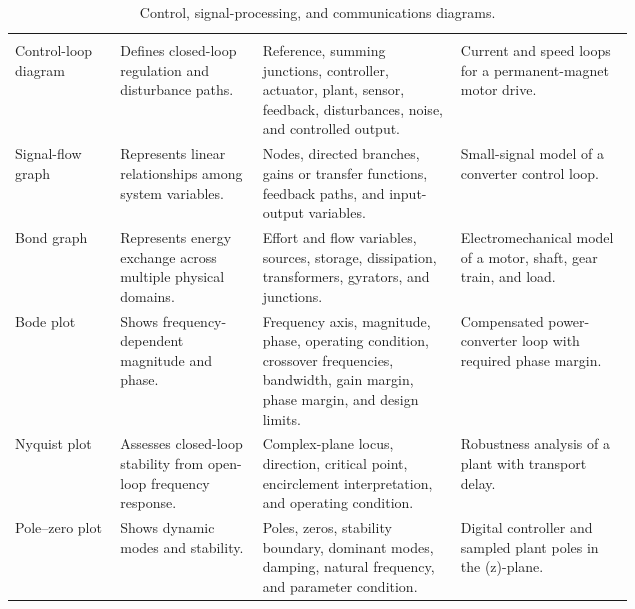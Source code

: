 \begin{singlespace}
\setlength{\LTcapwidth}{\linewidth}
\begin{longtable}{@{}L{0.17\linewidth} L{0.23\linewidth} L{0.32\linewidth} L{\tabcolsep\relax}@{}}
\caption{Control, signal-processing, and communications diagrams.}\label{tab:analysis-diagrams}\\
 &  &  &  \\
\midrule
\endfirsthead
{}
 &  &  &  \\
\midrule
\endhead
\bottomrule
\endfoot
Control-loop diagram & Defines closed-loop regulation and disturbance paths. & Reference, summing junctions, controller, actuator, plant, sensor, feedback, disturbances, noise, and controlled output. & Current and speed loops for a permanent-magnet motor drive. \\
\addlinespace[3pt]
Signal-flow graph & Represents linear relationships among system variables. & Nodes, directed branches, gains or transfer functions, feedback paths, and input-output variables. & Small-signal model of a converter control loop. \\
\addlinespace[3pt]
Bond graph & Represents energy exchange across multiple physical domains. & Effort and flow variables, sources, storage, dissipation, transformers, gyrators, and junctions. & Electromechanical model of a motor, shaft, gear train, and load. \\
\addlinespace[3pt]
Bode plot & Shows frequency-dependent magnitude and phase. & Frequency axis, magnitude, phase, operating condition, crossover frequencies, bandwidth, gain margin, phase margin, and design limits. & Compensated power-converter loop with required phase margin. \\
\addlinespace[3pt]
Nyquist plot & Assesses closed-loop stability from open-loop frequency response. & Complex-plane locus, direction, critical point, encirclement interpretation, and operating condition. & Robustness analysis of a plant with transport delay. \\
\addlinespace[3pt]
Pole--zero plot & Shows dynamic modes and stability. & Poles, zeros, stability boundary, dominant modes, damping, natural frequency, and parameter condition. & Digital controller and sampled plant poles in the (z)-plane. \\

\end{longtable}
\end{singlespace}
